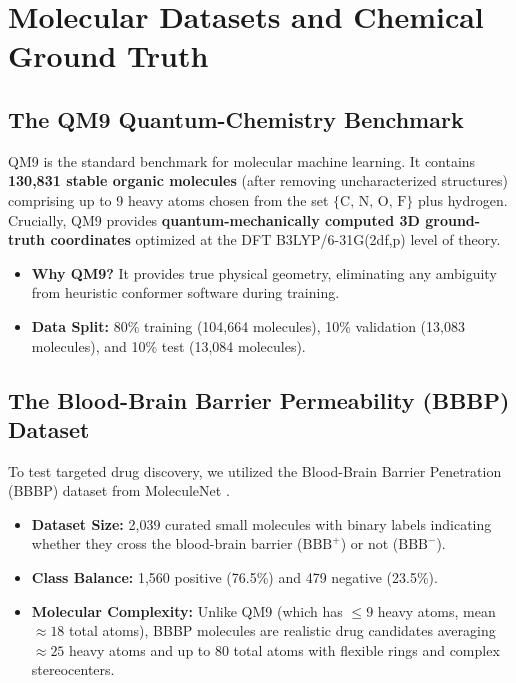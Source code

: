 \documentclass[12pt, a4paper]{article}
\begin{document}
\section{Molecular Datasets and Chemical Ground Truth}

\subsection{The QM9 Quantum-Chemistry Benchmark}
QM9 \cite{wu2018moleculenet} is the standard benchmark for molecular machine learning. It contains \textbf{130,831 stable organic molecules} (after removing uncharacterized structures) comprising up to 9 heavy atoms chosen from the set $\{\text{C, N, O, F}\}$ plus hydrogen. Crucially, QM9 provides \textbf{quantum-mechanically computed 3D ground-truth coordinates} optimized at the DFT B3LYP/6-31G(2df,p) level of theory.
\begin{itemize}[noitemsep]
    \item \textbf{Why QM9?} It provides true physical geometry, eliminating any ambiguity from heuristic conformer software during training.
    \item \textbf{Data Split:} 80\% training (104,664 molecules), 10\% validation (13,083 molecules), and 10\% test (13,084 molecules).
\end{itemize}

\subsection{The Blood-Brain Barrier Permeability (BBBP) Dataset}
To test targeted drug discovery, we utilized the Blood-Brain Barrier Penetration (BBBP) dataset from MoleculeNet \cite{wu2018moleculenet}.
\begin{itemize}[noitemsep]
    \item \textbf{Dataset Size:} 2,039 curated small molecules with binary labels indicating whether they cross the blood-brain barrier ($\text{BBB}^+$) or not ($\text{BBB}^-$).
    \item \textbf{Class Balance:} 1,560 positive (76.5\%) and 479 negative (23.5\%).
    \item \textbf{Molecular Complexity:} Unlike QM9 (which has $\leq 9$ heavy atoms, mean $\approx 18$ total atoms), BBBP molecules are realistic drug candidates averaging $\approx 25$ heavy atoms and up to 80 total atoms with flexible rings and complex stereocenters.
\end{itemize}
\end{document}
